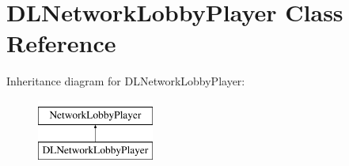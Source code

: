 \hypertarget{class_d_l_network_lobby_player}{}\section{D\+L\+Network\+Lobby\+Player Class Reference}
\label{class_d_l_network_lobby_player}
Inheritance diagram for D\+L\+Network\+Lobby\+Player\+:\begin{figure}[H]
\begin{center}
\leavevmode
\includegraphics[height=2.000000cm]{class_d_l_network_lobby_player}
\end{center}
\end{figure}
